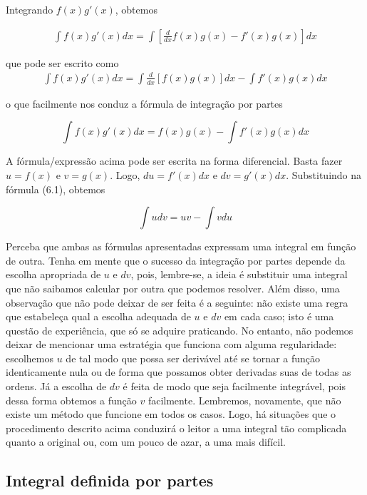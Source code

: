 	Integrando $f(x)g'(x)$, obtemos 
	
	\[\begin{split}
		\int f(x)g'(x)dx = \int \left[\frac{d}{dx}f(x)g(x) - f'(x)g(x)\right]dx
	\end{split}\]
	
	que pode ser escrito como
	\[\begin{split}
		\int f(x)g'(x)dx = \int \frac{d}{dx}\left[f(x)g(x)\right]dx - \int f'(x)g(x)dx
	\end{split}\]

	o que facilmente nos conduz a fórmula de integração por partes 
	
	\begin{equation}
		\boxed{ \int f(x)g'(x)dx = f(x)g(x)- \int f'(x)g(x)dx} 
	\end{equation}
	
	A fórmula/expressão acima pode ser escrita na forma diferencial. Basta fazer $u = f(x)$ e $v= g(x)$. Logo, $du = f'(x)dx$ e $dv = g'(x)dx$. Substituindo na fórmula (6.1), obtemos 
	
	\begin{equation}
		\boxed{ \int udv = uv - \int vdu} 
	\end{equation}
	
	 Perceba que ambas as fórmulas apresentadas expressam uma integral em função de outra. Tenha em mente que o sucesso da integração por partes depende da escolha apropriada de $u$ e $dv$, pois, lembre-se, a ideia é substituir uma integral que não saibamos calcular por outra que podemos resolver. Além disso, uma observação que não pode deixar de ser feita é a seguinte: não existe uma regra que estabeleça qual a escolha adequada de $u$ e $dv$ em cada caso; isto é uma questão de experiência, que só se adquire praticando. No entanto, não podemos deixar de mencionar uma estratégia que funciona com alguma regularidade: escolhemos $u$ de tal modo que possa ser derivável até se tornar a função identicamente nula ou de forma que possamos obter derivadas suas de todas as ordens. Já a escolha de $dv$ é feita de modo que seja facilmente integrável, pois dessa forma obtemos a função $v$ facilmente. Lembremos, novamente, que não existe um método que funcione em todos os casos. Logo, há situações que o procedimento descrito acima conduzirá o leitor a uma integral tão complicada quanto a original ou, com um pouco de azar, a uma mais difícil. 
	 
\subsection*{Integral definida por partes}
	
